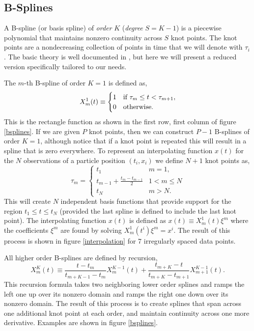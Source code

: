\documentclass[10pt,journal]{IEEEtran}
\begin{document}
\subsection{B-Splines}

A B-spline (or basis spline) of \emph{order} $K$ (\emph{degree} $S=K-1$) is a piecewise polynomial that maintains nonzero continuity across $S$ knot points. The knot points are a nondecreasing collection of points in time that we will denote with $\tau_i$. The basic theory is well documented in \cite{deboor1978-book}, but here we will present a reduced version specifically tailored to our needs.

The $m$-th B-spline of order $K=1$ is defined as,
\begin{equation}
X^1_m(t) \equiv \begin{cases}
1      & \text{if $ \tau_m \leq t < \tau_{m+1}$}, \\
0     & \text{otherwise}.
\end{cases}
\end{equation}
This is the rectangle function as shown in the first row, first column of figure \ref{bsplines}. If we are given $P$ knot points, then we can construct $P-1$ B-splines of order $K=1$, although notice that if a knot point is repeated this will result in a spline that is zero everywhere. To represent an interpolating function $x(t)$ for the $N$ observations of a particle position $(t_i,x_i)$ we define $N+1$ knot points as,
\begin{equation}
\tau_m = \begin{cases}
t_1      & \text{$m=1$}, \\
t_{m-1} + \frac{t_m-t_{m-1}}{2}	  & \text{$1<m \leq N$}\\
t_N     & \text{$m>N$}.
\end{cases}
\end{equation}
This will create $N$ independent basis functions that provide support for the region $t_1 \leq t \leq t_N$ (provided the last spline is defined to include the last knot point). The interpolating function $x(t)$ is defined as $x(t) \equiv  X^1_m(t) \xi^m$ where the coefficients $\xi^m$ are found by solving $X^1_m(t^i) \xi^m = x^i$. The result of this process is shown in figure \ref{interpolation} for 7 irregularly spaced data points.

All higher order B-splines are defined by recursion,
\begin{equation}
X^K_m(t) \equiv \frac{t - t_m}{t_{m+K-1} - t_m} X^{K-1}_m(t) + \frac{t_{m+K}-t}{t_{m+K} - t_{m+1}} X^{K-1}_{m+1}(t).
\end{equation}
This recursion formula takes two neighboring lower order splines and ramps the left one up over its nonzero domain and ramps the right one down over its nonzero domain. The result of this process is to create splines that span across one additional knot point at each order, and maintain continuity across one more derivative. Examples are shown in figure \ref{bsplines}.
\end{document}
